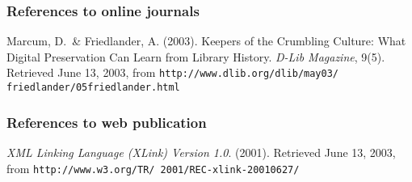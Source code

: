 \documentclass{article} \usepackage{proceed}
\begin{document}
\subsubsection*{References to online journals}

Marcum, D.~\& Friedlander, A.  (2003).  Keepers of the Crumbling
Culture: What Digital Preservation Can Learn from Library History.
\textit{D-Lib Magazine}, 9(5).  Retrieved June 13, 2003, from
\footnotesize{\texttt{http://www.dlib.org/dlib/may03/
friedlander/05friedlander.html}}

\subsubsection*{References to web publication}

\textit{XML Linking Language (XLink) Version 1.0}.  (2001).  Retrieved
June 13, 2003, from
\footnotesize{\texttt{http://www.w3.org/TR/
2001/REC-xlink-20010627/}}
\end{document}
